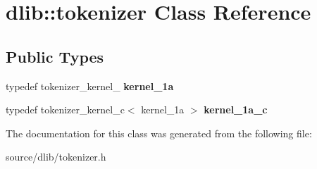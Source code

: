 \hypertarget{classdlib_1_1tokenizer}{
\section{dlib::tokenizer Class Reference}
\label{classdlib_1_1tokenizer}
}
\subsection*{Public Types}
\begin{DoxyCompactItemize}
\item 
\hypertarget{classdlib_1_1tokenizer_a1c3ad3f7f55462ea12b2b35fdd8e2b8e}{
typedef tokenizer\_\-kernel\_ {\bfseries kernel\_\-1a}}
\label{classdlib_1_1tokenizer_a1c3ad3f7f55462ea12b2b35fdd8e2b8e}

\item 
\hypertarget{classdlib_1_1tokenizer_a3c78f32311ba8cf41f75c3074124a2da}{
typedef tokenizer\_\-kernel\_\-c$<$ kernel\_\-1a $>$ {\bfseries kernel\_\-1a\_\-c}}
\label{classdlib_1_1tokenizer_a3c78f32311ba8cf41f75c3074124a2da}

\end{DoxyCompactItemize}


The documentation for this class was generated from the following file:\begin{DoxyCompactItemize}
\item 
source/dlib/tokenizer.h\end{DoxyCompactItemize}
